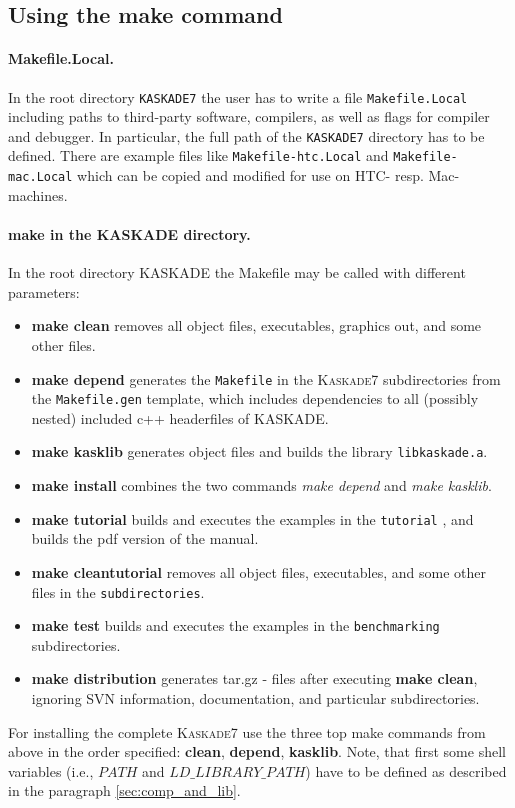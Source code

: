 \documentclass[11pt]{article}
\newcommand{\K}{\textsc{Kaskade7 }}
\begin{document}
\subsection{Using the make command}
\paragraph{Makefile.Local.}
In the root directory {\tt KASKADE7} the user has to write a file {\tt Makefile.Local} including paths to third-party software, compilers,
as well as flags for compiler and debugger. In particular, the full path of the {\tt KASKADE7} directory has to be defined.
There are example files like {\tt Makefile-htc.Local} and {\tt Makefile-mac.Local} which can be copied and modified for use on HTC- resp. Mac-machines.


\paragraph{make in the KASKADE directory.}
In the root directory KASKADE the Makefile may be called with different parameters:
\begin{itemize}
\item {\bf make clean} removes all object files, executables, graphics out, and some other files.
\item {\bf make depend} generates the {\tt Makefile} in the \K subdirectories from the {\tt Makefile.gen} template, which includes dependencies to all (possibly nested) included c++ headerfiles of KASKADE.
\item {\bf make kasklib} generates object files and builds the library {\tt libkaskade.a}.
\item {\bf make install} combines the two commands {\it make depend} and {\it make kasklib}.
\item {\bf make tutorial} builds and executes the examples in the {\tt tutorial} , and builds the pdf version of the manual.
\item {\bf make cleantutorial} removes all object files, executables, and some other files in the {\tt subdirectories}.       
\item {\bf make test} builds and executes the examples in the {\tt benchmarking} subdirectories.
\item {\bf make distribution} generates tar.gz - files after executing {\bf make clean}, ignoring SVN information,
documentation, and particular subdirectories.
\end{itemize}

\noindent For installing the complete \K use the three top make commands from above in the order specified: 
{\bf clean}, {\bf depend}, {\bf kasklib}. 
Note, that first some shell variables (i.e., $PATH$ and $LD\_LIBRARY\_PATH$) 
have to be defined as described in the paragraph \ref{sec:comp_and_lib}.
\end{document}
